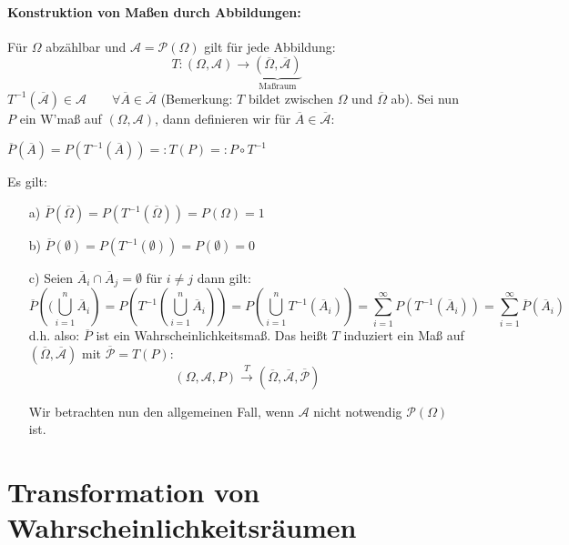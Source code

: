 \documentclass[10pt,a4paper]{report}
\numberwithin{equation}{section}
\numberwithin{figure}{section}
\theoremstyle{plain}
\theoremstyle{definition}
\theoremstyle{remark}
\theoremstyle{plain}
\newcommand{\1}{ \mathbb{1} } %
\begin{document}
\paragraph{Konstruktion von Maßen durch Abbildungen:}
Für $\Omega$ abzählbar und $\mathcal{A}=\mathcal{P}(\Omega)$ gilt für jede Abbildung:
\[T:(\Omega,\mathcal{A}) \to \underbrace{(\overline{\Omega},\overline{\mathcal{A}})}_\text{Maßraum}\]
$T^{-1}(\overline{\mathcal{A}})\in \mathcal{A} \qquad \forall \overline{A} \in \overline{\mathcal{A}}$ (Bemerkung: $T$ bildet zwischen $\Omega$ und  $\overline{\Omega}$ ab). Sei nun $P$ ein W'maß auf $(\Omega,\mathcal{A})$, dann definieren wir für $\overline{A} \in \overline{\mathcal{A}}$:
\begin{center}
  $\overline{P}(\overline{A})=P(T^{-1}(\overline{A}))=:T(P)=:P\circ T^{-1}$
\end{center}
Es gilt:
\begin{itemize}
\item[a)] $\overline{P}(\overline{\Omega})=P(T^{-1}(\overline{\Omega}))=P(\Omega)=1$
\item[b)] $\overline{P}(\emptyset)=P(T^{-1}(\emptyset))=P(\emptyset)=0$
\item[c)] Seien $\overline{A}_i\cap \overline{A}_j=\emptyset$ für $i\neq j$ dann gilt:
  \[\overline{P}\left((\bigcup\limits_{i=1}^n \overline{A}_i \right)=P\left(T^{-1}\left(\bigcup\limits_{i=1}^n \overline{A}_i\right)\right)=P\left(\bigcup\limits_{i=1}^n T^{-1}(\overline{A}_i)\right)=\sum\limits_{i=1}^\infty P(T^{-1}(\overline{A}_i))=\sum\limits_{i=1}^\infty \overline{P}(\overline{A}_i)\]
  d.h. also: $\overline{P}$ ist ein Wahrscheinlichkeitsmaß. Das heißt
  $T$ induziert ein Maß auf
  $(\overline{\Omega},\overline{\mathcal{A}})$ mit
  $\overline{\mathcal{P}}=T(P)$:
  \[(\Omega, \mathcal{A}, P)
  \overset{T}{\to}(\overline{\Omega},\overline{\mathcal{A}},\overline{\mathcal{P}})\]

  Wir betrachten nun den allgemeinen Fall, wenn $\mathcal{A}$ nicht notwendig $\mathcal{P}(\Omega)$ ist.
\end{itemize}
\section{Transformation von Wahrscheinlichkeitsräumen}
\label{sec:trafo-wraeume}
\end{document}
